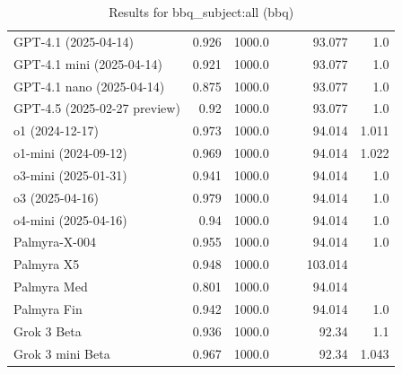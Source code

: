 \begin{table}[htp]
{\begin{tabular}{lrrrrrr}
GPT-4.1 (2025-04-14) & 0.926 & 1000.0 &  &  & 93.077 & 1.0 \\
GPT-4.1 mini (2025-04-14) & 0.921 & 1000.0 &  &  & 93.077 & 1.0 \\
GPT-4.1 nano (2025-04-14) & 0.875 & 1000.0 &  &  & 93.077 & 1.0 \\
GPT-4.5 (2025-02-27 preview) & 0.92 & 1000.0 &  &  & 93.077 & 1.0 \\
o1 (2024-12-17) & 0.973 & 1000.0 &  &  & 94.014 & 1.011 \\
o1-mini (2024-09-12) & 0.969 & 1000.0 &  &  & 94.014 & 1.022 \\
o3-mini (2025-01-31) & 0.941 & 1000.0 &  &  & 94.014 & 1.0 \\
o3 (2025-04-16) & 0.979 & 1000.0 &  &  & 94.014 & 1.0 \\
o4-mini (2025-04-16) & 0.94 & 1000.0 &  &  & 94.014 & 1.0 \\
Palmyra-X-004 & 0.955 & 1000.0 &  &  & 94.014 & 1.0 \\
Palmyra X5 & 0.948 & 1000.0 &  &  & 103.014 &  \\
Palmyra Med & 0.801 & 1000.0 &  &  & 94.014 &  \\
Palmyra Fin & 0.942 & 1000.0 &  &  & 94.014 & 1.0 \\
Grok 3 Beta & 0.936 & 1000.0 &  &  & 92.34 & 1.1 \\
Grok 3 mini Beta & 0.967 & 1000.0 &  &  & 92.34 & 1.043 \\
\bottomrule
\end{tabular}}
\caption{Results for bbq_subject:all (bbq)}
\label{fig:bbq_subject:all (bbq)}
\end{table}